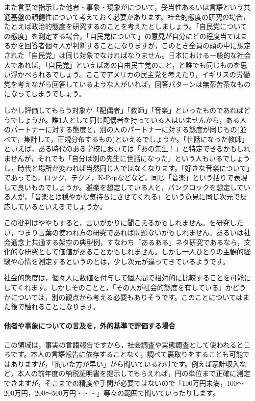 \documentclass{ltjsbook}
\begin{document}
また言葉で指示した他者・事象・現象がについて，妥当性あるいは言語という共通基盤の頑健性について考えておく必要があります。社会的態度の研究の場合，たとえば政治的態度を研究するのことを考えたとしましょう。「自民党についての態度」を測定する場合，「自民党について」の意見が自分にどの程度当てはまるかを回答者個々人が判断することになりますが，このとき全員の頭の中に想定された「自民党」は同じ対象でなければなりません。日本における一般的な社会人であれば，「自民党」といえばあの自由民主党のこと，と誰でも同じものを思い浮かべられるでしょう。ここでアメリカの民主党を考えたり，イギリスの労働党を考えながら回答しているような人がいれば，回答パターンは無茶苦茶なものになってしまうでしょう。

しかし評価してもらう対象が「配偶者」「教師」「音楽」といったものであればどうでしょうか。誰1人として同じ配偶者を持っている人はいませんから，ある人のパートナーに対する態度と，別の人のパートナーに対する態度が同じもの(並べて，集計して，正規分布するもの)といえるでしょうか。「世話になった教師」といえば，ある時代のある学校においては「あの先生！」と特定できるかもしれませんが，それでも「自分は別の先生に世話になった」という人もいるでしょうし，時代と場所が変われば当然同じ人ではなくなります。「好きな音楽について」であっても，ロック，テクノ，K-Popなどなど，同じ「音楽」という括りで表現して良いものでしょうか。雅楽を想定している人と，パンクロックを想定している人が，「音楽とは穏やかな気持ちにさせてくれる」という意見に同じ次元で反応しているといえるでしょうか。

この批判はややもすると，言いがかりに聞こえるかもしれません。を研究したい，つまり言葉の使われ方の研究であれば問題ないかもしれません。あるいは社会通念上共通する架空の典型例，すなわち「あるある」ネタ研究であるなら，文化的な研究として価値があることかもしれません。しかし一人ひとりの主観的経験や心情を測定するというのとは，少し次元が違ってきているようです。

社会的態度は，個々人に数値を付与して個人間で相対的に比較することを可能にしてくれます。しかしそのことと，「その人が社会的態度を有している」かどうかについては，別の観点から考える必要もありそうです。このことについてはまた後で触れることになります。

\paragraph{他者や事象についての言及を，外的基準で評価する場合}
この領域は，事実の言語報告ですから，社会調査や実態調査として使われるところです。本人の言語報告に依存することなく，調べて裏取りをすることも可能ではありますが，「聞いた方が早い」から聞いているわけです。例えば家計収入など，本人の前年度の納税証明書を提示してもらえれば，円の単位まで正確に測定できますが，そこまでの精度や手間が必要ではないので「100万円未満，100〜200万円，200〜500万円・・・」等々の範囲で聞いていったりします。
\end{document}
